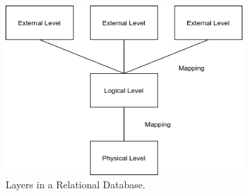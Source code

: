 \begin{figure}[h!]
    \caption{Layers in a Relational Database.}
    \label{image:rdbmsLayers}
    \centering
    \includegraphics[width=0.8\textwidth]{images/RDBMS_Layers.png}
\end{figure}

